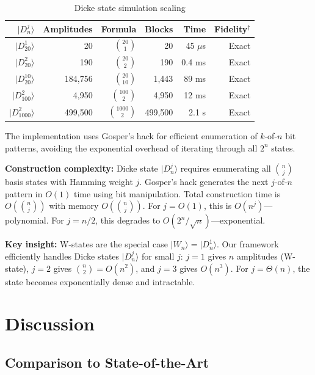\documentclass[11pt,twocolumn]{article}
\begin{document}
\begin{table}[H]
\centering
\caption{Dicke state simulation scaling}
\label{tab:dicke}
\begin{tabular}{@{}rrrrrr@{}}
\toprule
$|D_n^j\rangle$ & Amplitudes & Formula & Blocks & Time & Fidelity$^\dagger$ \\
\midrule
$|D_{20}^{1}\rangle$ & 20 & $\binom{20}{1}$ & 20 & 45 $\mu$s & Exact \\
$|D_{20}^{2}\rangle$ & 190 & $\binom{20}{2}$ & 190 & 0.4 ms & Exact \\
$|D_{20}^{10}\rangle$ & 184,756 & $\binom{20}{10}$ & 1,443 & 89 ms & Exact \\
$|D_{100}^{2}\rangle$ & 4,950 & $\binom{100}{2}$ & 4,950 & 12 ms & Exact \\
$|D_{1000}^{2}\rangle$ & 499,500 & $\binom{1000}{2}$ & 499,500 & 2.1 s & Exact \\
\bottomrule
\end{tabular}
\end{table}

The implementation uses Gosper's hack \cite{gosper1972hakmem} for efficient enumeration of $k$-of-$n$ bit patterns, avoiding the exponential overhead of iterating through all $2^n$ states.

\textbf{Construction complexity:} Dicke state $|D_n^j\rangle$ requires enumerating all $\binom{n}{j}$ basis states with Hamming weight $j$. Gosper's hack generates the next $j$-of-$n$ pattern in $O(1)$ time using bit manipulation. Total construction time is $O(\binom{n}{j})$ with memory $O(\binom{n}{j})$. For $j = O(1)$, this is $O(n^j)$---polynomial. For $j = n/2$, this degrades to $O(2^n/\sqrt{n})$---exponential.

\textbf{Key insight:} W-states are the special case $|W_n\rangle = |D_n^1\rangle$. Our framework efficiently handles Dicke states $|D_n^j\rangle$ for small $j$: $j=1$ gives $n$ amplitudes (W-state), $j=2$ gives $\binom{n}{2} = O(n^2)$, and $j=3$ gives $O(n^3)$. For $j = \Theta(n)$, the state becomes exponentially dense and intractable.

\section{Discussion}

\subsection{Comparison to State-of-the-Art}
\end{document}
